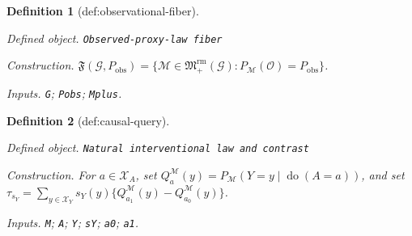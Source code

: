 \documentclass{article}
\newtheorem{definition}{Definition}
\begin{document}
\begin{definition}[def:observational-fiber]\label{def:observational-fiber}
\par\smallskip\noindent\emph{Defined object.} \texttt{Observed-\allowbreak{}proxy-\allowbreak{}law fiber}
\par\smallskip\noindent\emph{Construction.} \(\mathfrak F(\mathcal G,P_{\mathrm{obs}})=\{\mathcal M\in\mathfrak M_{+}^{\mathrm{rm}}(\mathcal G):P_{\mathcal M}(\mathcal O)=P_{\mathrm{obs}}\}\).
\par\smallskip\noindent\emph{Inputs.} \texttt{G}; \texttt{Pobs}; \texttt{Mplus}.
\end{definition}

\begin{definition}[def:causal-query]\label{def:causal-query}
\par\smallskip\noindent\emph{Defined object.} \texttt{Natural interventional law and contrast}
\par\smallskip\noindent\emph{Construction.} For \(a\in\mathcal X_A\), set \(Q_a^{\mathcal M}(y)=P_{\mathcal M}(Y=y\mid\operatorname{do}(A=a))\), and set \(\tau_{s_Y}=\sum_{y\in\mathcal X_Y}s_Y(y)\{Q_{a_1}^{\mathcal M}(y)-Q_{a_0}^{\mathcal M}(y)\}\).
\par\smallskip\noindent\emph{Inputs.} \texttt{M}; \texttt{A}; \texttt{Y}; \texttt{sY}; \texttt{a0}; \texttt{a1}.
\end{definition}
\end{document}
